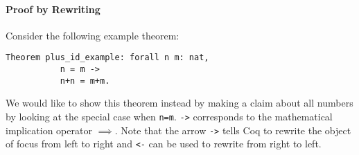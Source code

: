 	     \paragraph{Proof by Rewriting} 
	     \label{par:ProofByRewriting}
	     
	     Consider the following example theorem:     
		 \begin{lstlisting}[caption=\lstinline!plus_id_examples!]
		 Theorem plus_id_example: forall n m: nat,
	       n = m -> 
		   n+n = m+m.	 
		 \end{lstlisting}
		 We would like to show this theorem instead by making a claim about all numbers by looking at the special case when \lstinline!n=m!.
	     \lstinline!->! corresponds to the mathematical implication operator $\implies$. 
	     Note that the arrow \lstinline!->! tells Coq to rewrite the object of focus from left to right and \lstinline!<-! can be used to rewrite from right to left.\\
	     

